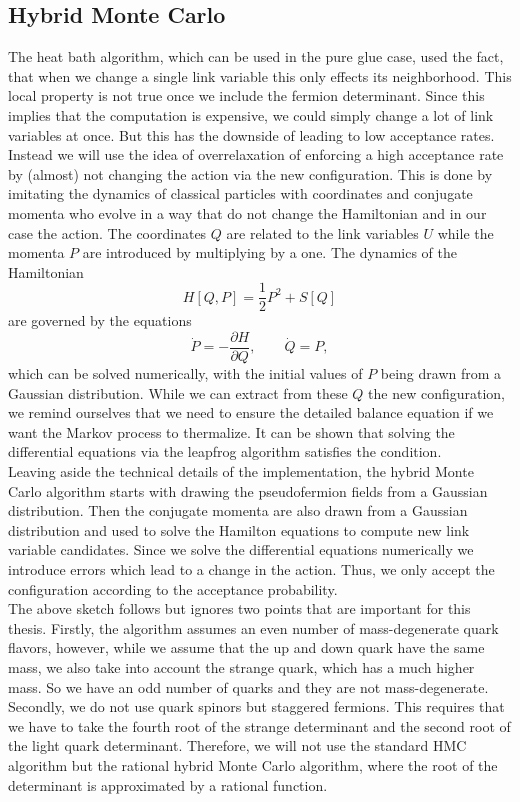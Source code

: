\subsection{Hybrid Monte Carlo}
The heat bath algorithm, which can be used in the pure glue case, used the fact, that when we change a single link variable this only effects its neighborhood. This local property is not true once we include the fermion determinant. Since this implies that the computation is expensive, we could simply change a lot of link variables at once. But this has the downside of leading to low acceptance rates. Instead we will use the idea of overrelaxation of enforcing a high acceptance rate by (almost) not changing the action via the new configuration. This is done by imitating the dynamics of classical particles with coordinates and conjugate momenta who evolve in a way that do not change the Hamiltonian and in our case the action. The coordinates $Q$ are related to the link variables $U$ while the momenta $P$ are introduced by multiplying by a one. The dynamics of the Hamiltonian 
\begin{equation}
    H[Q,P]=\frac{1}{2}P^2+S[Q]
\end{equation}
are governed by the equations
\begin{equation}
    \dot P =-\frac{\partial H}{\partial Q},\qquad \dot Q=P,
\end{equation}
which can be solved numerically, with the initial values of $P$ being drawn from a Gaussian distribution. While we can extract from these $Q$ the new configuration, we remind ourselves that we need to ensure the detailed balance equation if we want the Markov process to thermalize. It can be shown that solving the differential equations via the leapfrog algorithm satisfies the condition.\\
Leaving aside the technical details of the implementation, the hybrid Monte Carlo algorithm starts with drawing the pseudofermion fields from a Gaussian distribution. Then the conjugate momenta are also drawn from a Gaussian distribution and used to solve the Hamilton equations to compute new link variable candidates. Since we solve the differential equations numerically we introduce errors which lead to a change in the action. Thus, we only accept the configuration according to the acceptance probability.\\
The above sketch follows \cite{gattringer} but ignores two points that are important for this thesis. Firstly, the algorithm assumes an even number of mass-degenerate quark flavors, however, while we assume that the up and down quark have the same mass, we also take into account the strange quark, which has a much higher mass. So we have an odd number of quarks and they are not mass-degenerate. Secondly, we do not use quark spinors but staggered fermions. This requires that we have to take the fourth root of the strange determinant and the second root of the light quark determinant. Therefore, we will not use the standard HMC algorithm but the rational hybrid Monte Carlo algorithm, where the root of the determinant is approximated by a rational function\cite{bielefeldPHD}.

